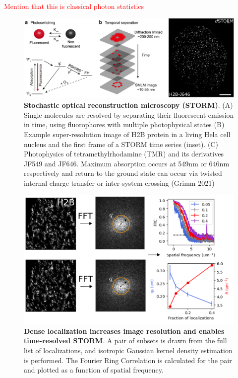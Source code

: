 \documentclass{ucetd}
\begin{document}
\textcolor{red}{Mention that this is classical photon statistics}

\begin{figure}
\includegraphics[width=\textwidth]{Intro.png}
\caption{\textbf{Stochastic optical reconstruction microscopy (STORM)}. (A) Single molecules are resolved by separating their fluorescent emission in time, using fluorophores with multiple photophysical states (B) Example super-resolution image of H2B protein in a living Hela cell nucleus and the first frame of a STORM time series (inset). (C) Photophysics of tetramethylrhodamine (TMR) and its derivatives JF549 and JF646. Maximum absorption occurs at 549nm or 646nm respectively and return to the ground state can occur via twisted internal charge transfer or inter-system crossing (Grimm 2021)}
\end{figure}


\begin{figure}
\begin{center}
\includegraphics[width=13cm]{FRC.png}
\end{center}
\caption{\textbf{Dense localization increases image resolution and enables time-resolved STORM}. A pair of subsets is drawn from the full list of localizations, and isotropic Gaussian kernel density estimation is performed. The Fourier Ring Correlation is calculated for the pair and plotted as a function of spatial frequency.}
\end{figure}
\end{document}
